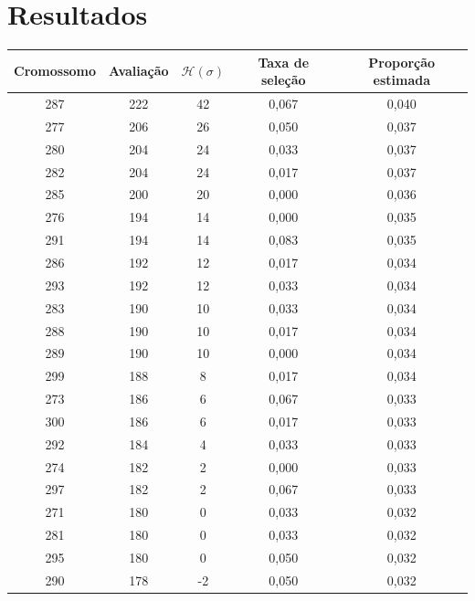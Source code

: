 
\chapter{Resultados}
\label{chap:anexos}

\begin{table}[htb]
	\begin{tabular}{|c|c|c|c|c|}
		\hline
		\textbf{Cromossomo} 	& \textbf{Avaliação} 	& \textbf{\(\mathcal{H}(\sigma) \)}	& \textbf{Taxa de seleção}	& \textbf{Proporção estimada} \\
		\hline
		287	&  222	&  42 	&  0,067	&  0,040 \\ \hline 
		277	&  206	&  26 	&  0,050	&  0,037 \\ \hline 
		280	&  204	&  24 	&  0,033	&  0,037 \\ \hline 
		282	&  204	&  24 	&  0,017	&  0,037 \\ \hline 
		285	&  200	&  20 	&  0,000	&  0,036 \\ \hline 
		276	&  194	&  14 	&  0,000	&  0,035 \\ \hline 
		291	&  194	&  14 	&  0,083	&  0,035 \\ \hline 
		286	&  192	&  12 	&  0,017	&  0,034 \\ \hline 
		293	&  192	&  12 	&  0,033	&  0,034 \\ \hline 
		283	&  190	&  10 	&  0,033	&  0,034 \\ \hline 
		288	&  190	&  10 	&  0,017	&  0,034 \\ \hline 
		289	&  190	&  10 	&  0,000	&  0,034 \\ \hline 
		299	&  188	&  8 	&  0,017	&  0,034 \\ \hline 
		273	&  186	&  6 	&  0,067	&  0,033 \\ \hline 
		300	&  186	&  6 	&  0,017	&  0,033 \\ \hline 
		292	&  184	&  4 	&  0,033	&  0,033 \\ \hline 
		274	&  182	&  2 	&  0,000	&  0,033 \\ \hline 
		297	&  182	&  2 	&  0,067	&  0,033 \\ \hline 
		271	&  180	&  0 	&  0,033	&  0,032 \\ \hline 
		281	&  180	&  0 	&  0,033	&  0,032 \\ \hline 
		295	&  180	&  0 	&  0,050	&  0,032 \\ \hline 
		290	&  178	&  -2 	&  0,050	&  0,032 \\ \hline 

\end{tabular}
\end{table}
